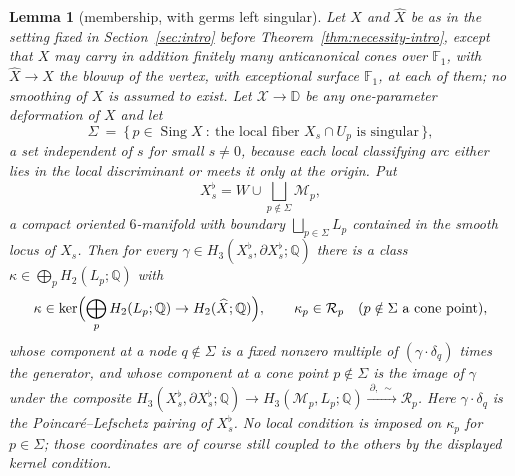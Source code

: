 \documentclass[11pt]{amsart}
\newtheorem{lemma}[theorem]{Lemma}
\theoremstyle{definition}
\theoremstyle{remark}
\theoremstyle{plain}
\newcommand{\QQ}{\mathbb{Q}}
\newcommand{\Rsm}{\mathcal{R}}   %
\newcommand{\Mil}{\mathcal{M}}  %
\newcommand{\cX}{\mathcal{X}}
\newcommand{\Sing}{\operatorname{Sing}}
\newcommand{\Xh}{\widehat{X}}
\newcommand{\Disk}{\mathbb{D}}
\begin{document}
\begin{lemma}[membership, with germs left singular]\label{lem:Mpartial}
Let $X$ and $\Xh$ be as in the setting fixed in
Section~\ref{sec:intro} before Theorem~\ref{thm:necessity-intro}, except that
$X$ may carry in addition finitely many anticanonical cones over
$\mathbb F_1$, with $\Xh\to X$ the blowup of the vertex, with exceptional
surface $\mathbb F_1$, at each of them; no smoothing of $X$ is assumed to exist.  Let $\cX\to\Disk$ be
any one-parameter deformation of $X$ and let
\[
\Sigma\ =\ \{\,p\in\Sing X\ :\ \text{the local fiber }X_s\cap U_p
\text{ is singular}\,\},
\]
a set independent of $s$ for small $s\neq0$, because each local
classifying arc either lies in the local discriminant or meets it
only at the origin.  Put
\[
X_s^{\flat}=W\cup\bigsqcup_{p\notin\Sigma}\Mil_p ,
\]
a compact oriented $6$-manifold with boundary
$\bigsqcup_{p\in\Sigma}L_p$ contained in the smooth locus of $X_s$.
Then for every $\gamma\in H_3(X_s^{\flat},\partial X_s^{\flat};\QQ)$
there is a class $\kappa\in\bigoplus_pH_2(L_p;\QQ)$ with
\[
\kappa\in\ker\Bigl(\bigoplus_pH_2(L_p;\QQ)\to H_2(\Xh;\QQ)\Bigr),
\qquad
\kappa_p\in \Rsm_p\quad(p\notin\Sigma\text{ a cone point}),
\]
whose component at a node $q\notin\Sigma$ is a fixed nonzero multiple
of $(\gamma\cdot\delta_q)$ times the generator, and whose component at
a cone point $p\notin\Sigma$ is the image of $\gamma$ under the
composite
$H_3(X_s^{\flat},\partial X_s^{\flat};\QQ)\to H_3(\Mil_p,L_p;\QQ)
\xrightarrow{\ \partial,\ \sim\ }\Rsm_p$.  Here $\gamma\cdot\delta_q$ is
the Poincar\'e--Lefschetz pairing of $X_s^{\flat}$.  No \emph{local}
condition is imposed on $\kappa_p$ for $p\in\Sigma$; those coordinates
are of course still coupled to the others by the displayed kernel
condition.
\end{lemma}
\end{document}
